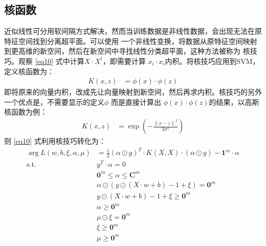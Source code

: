 \documentclass[12pt, a4paper, oneside]{ctexart}
\begin{document}
\subsection{核函数}
近似线性可分用软间隔方式解决，然而当训练数据是非线性数据，会出现无法在原特征空间找到分离超平面。可以使用
一个非线性变换，将数据从原特征空间映射到更高维的新空间，然后在新空间中寻找线性分类超平面，这种方法被称为
核技巧。观察 \eqref{eq10} 式中计算$X \cdot X^t $，即需要计算 $x_i \cdot x_i$内积。将核技巧应用到SVM，
定义核函数为：
\begin{align*}
K(x, z) &=  \phi(x) \cdot \phi(z)
\end{align*}
即将原来的向量内积，改成先让向量映射到新空间，然后再求内积。核技巧的另外一个优点是，不需要显示的定义$\phi$
而是直接计算出 $\phi(x) \cdot \phi(z)$的结果，以高斯核函数为例：
\begin{align*}
    K(x, z) &=  \exp ( -\frac{\left\|x-z\right\|^2}{2\sigma^2 }) 
\end{align*}
则 \eqref{eq10} 式利用核技巧转化为：
\begin{align}
    \mathop{\arg\min_{\alpha}}  L(w, b, \xi, {\alpha}, \mu) &= \frac{1}{2}(\alpha \odot y)^T \cdot K(X, X) \cdot (\alpha \odot y) - \boldsymbol{1}^m \cdot \alpha \label{eq11}\\
    \mathrm{ s.t. }\ \   &y^T \cdot \alpha = 0 \nonumber \\
    & \boldsymbol{0}^m \leq \alpha \leq \boldsymbol{C}^m \nonumber \\
    &{\alpha} \odot  (y \odot (X \cdot w + b) - 1 + \xi) = \boldsymbol{0}^m \nonumber \\
    &y \odot (X \cdot w + b) - 1  + \xi \geq \boldsymbol{0}^m \nonumber \\
    &{\alpha} \geq \boldsymbol{0}^m  \nonumber \\
    &\mu \odot \xi =  \boldsymbol{0}^m \nonumber \\
    &\xi \geq \boldsymbol{0}^m  \nonumber \\
    &\mu \geq \boldsymbol{0}^m  \nonumber 
\end{align}
\end{document}
